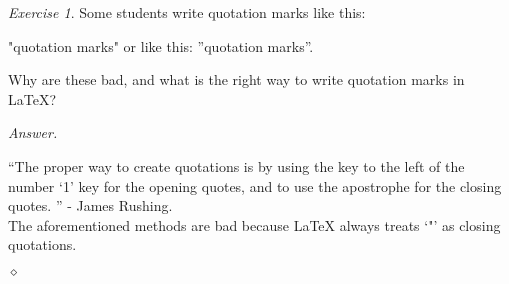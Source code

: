 \documentclass[12pt,oneside]{amsart}
\theoremstyle{definition}
\theoremstyle{remark}
\newtheorem{exer}{Exercise}
\numberwithin{equation}{exer}
\newenvironment{answer}{\bigskip\noindent\emph{Answer.}}{\hfill$\diamond$\newline}
\begin{document}
\newpage



\begin{exer}

Some students write quotation marks like this:

"quotation marks" or like this: ''quotation marks''.

Why are these bad, and what is the right way to write quotation marks in \LaTeX?

\end{exer}

\begin{answer}

``The proper way to create quotations is by using the key to the left of the number `1' key for the opening quotes, and to use the apostrophe for the closing quotes. '' - James Rushing. \\ \indent The aforementioned methods are bad because \LaTeX \: always treats `"' as closing quotations. 

\end{answer}
\end{document}

